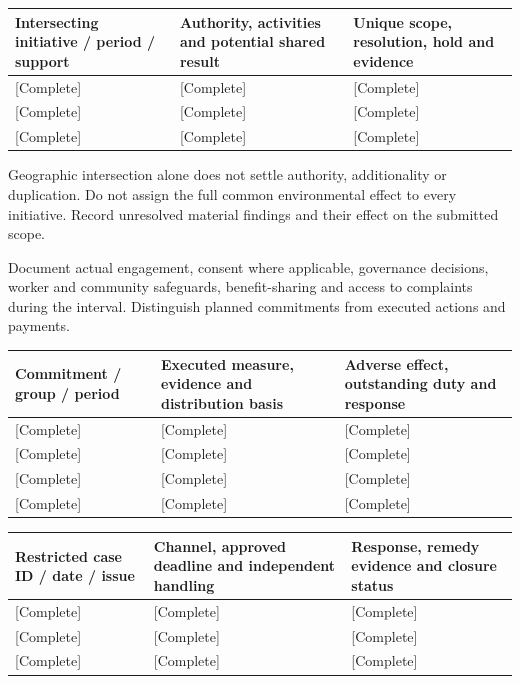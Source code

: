 {\sffamily\fontsize{8.6}{10.7}\selectfont\begin{longtable}{@{}P{48mm}P{61mm}P{53mm}@{}}
\toprule
\textbf{Intersecting initiative / period / support} & \textbf{Authority, activities and potential shared result} & \textbf{Unique scope, resolution, hold and evidence}\\\midrule\endhead
\rule{0pt}{8mm}[Complete] & [Complete] & [Complete]\\\hline
\rule{0pt}{8mm}[Complete] & [Complete] & [Complete]\\\hline
\rule{0pt}{8mm}[Complete] & [Complete] & [Complete]\\\hline
\end{longtable}}
Geographic intersection alone does not settle authority, additionality or duplication. Do not assign the full common environmental effect to every initiative. Record unresolved material findings and their effect on the submitted scope.\par
{}
Document actual engagement, consent where applicable, governance decisions, worker and community safeguards, benefit-sharing and access to complaints during the interval. Distinguish planned commitments from executed actions and payments.\par
{}
{\sffamily\fontsize{8.6}{10.7}\selectfont\begin{longtable}{@{}P{48mm}P{61mm}P{53mm}@{}}
\toprule
\textbf{Commitment / group / period} & \textbf{Executed measure, evidence and distribution basis} & \textbf{Adverse effect, outstanding duty and response}\\\midrule\endhead
\rule{0pt}{8mm}[Complete] & [Complete] & [Complete]\\\hline
\rule{0pt}{8mm}[Complete] & [Complete] & [Complete]\\\hline
\rule{0pt}{8mm}[Complete] & [Complete] & [Complete]\\\hline
\rule{0pt}{8mm}[Complete] & [Complete] & [Complete]\\\hline
\end{longtable}}
{\sffamily\fontsize{8.6}{10.7}\selectfont\begin{longtable}{@{}P{48mm}P{61mm}P{53mm}@{}}
\toprule
\textbf{Restricted case ID / date / issue} & \textbf{Channel, approved deadline and independent handling} & \textbf{Response, remedy evidence and closure status}\\\midrule\endhead
\rule{0pt}{8mm}[Complete] & [Complete] & [Complete]\\\hline
\rule{0pt}{8mm}[Complete] & [Complete] & [Complete]\\\hline
\rule{0pt}{8mm}[Complete] & [Complete] & [Complete]\\\hline
\end{longtable}}
